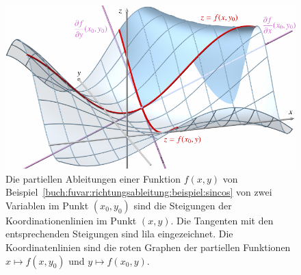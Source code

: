 %
%
%
\begin{figure}
\centering
\includegraphics{chapters/010-fuvar/images/partabl.pdf}
\caption{Die partiellen Ableitungen einer Funktion $f(x,y)$
von Beispiel~\ref{buch:fuvar:richtungsableitung:beispiel:sincos} von
zwei Variablen im Punkt $(x_0,y_0)$ sind die Steigungen der
Koordinationenlinien im Punkt $(x,y)$.
Die Tangenten mit den entsprechenden Steigungen sind
{\color{tangentenfarbe}lila} eingezeichnet.
Die Koordinatenlinien sind die {\color{darkred}roten} Graphen der
partiellen Funktionen $x\mapsto f(x,y_0)$ und $y\mapsto f(x_0,y)$.
\label{buch:fuvar:richtungsableitung:fig:partabl}}
\end{figure}
